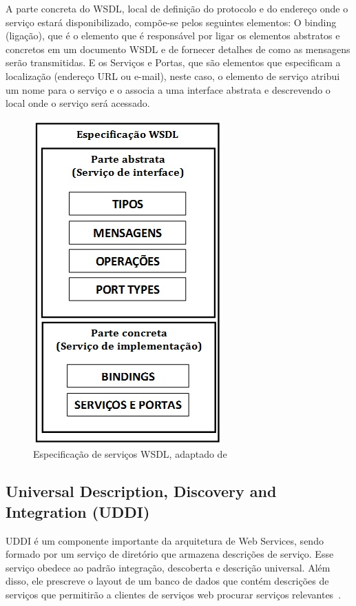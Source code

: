A parte concreta do WSDL, local de definição do protocolo e do endereço onde o serviço estará disponibilizado, compõe-se pelos seguintes elementos: O binding (ligação), que é o elemento que é responsável por ligar os elementos abstratos e concretos em um documento WSDL e de fornecer detalhes de como as mensagens serão transmitidas. E os Serviços e Portas, que são elementos que especificam a localização (endereço URL ou e-mail), neste caso, o elemento de serviço atribui um nome para o serviço e o associa a uma interface abstrata e descrevendo o local onde o serviço será acessado.

\begin{figure}[!htb]
\centering
\includegraphics[scale=0.5]{COMPOSICAO_WSDL.jpg}
\caption{Especificação de serviços WSDL, adaptado de~\cite{Bertino2010}}
\label{fig:composicao_WSDL}
\end{figure}


\subsection{Universal Description, Discovery and Integration (UDDI)}

UDDI é um componente importante da arquitetura de Web Services, sendo formado por um serviço de diretório que armazena descrições de serviço. Esse serviço obedece ao padrão integração, descoberta e descrição universal. Além disso,  ele prescreve o layout de um banco de dados que contém  descrições de serviços que permitirão a clientes de serviços web procurar serviços relevantes~\cite{TANENBAUM2007}.

